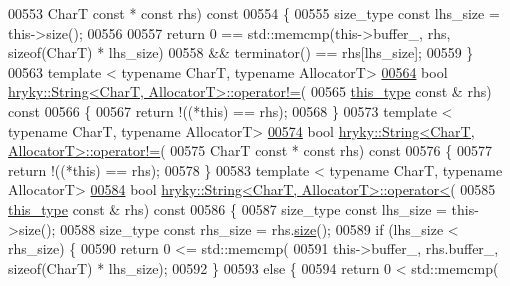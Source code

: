 \begin{DoxyCode}
00553     CharT \textcolor{keyword}{const} * \textcolor{keyword}{const} rhs)\textcolor{keyword}{ const}
00554 \textcolor{keyword}{}\{
00555     size\_type \textcolor{keyword}{const} lhs\_size = this->size();
00556     
00557     \textcolor{keywordflow}{return} 0 == std::memcmp(this->buffer\_, rhs, \textcolor{keyword}{sizeof}(CharT) * lhs\_size)
00558         && terminator() == rhs[lhs\_size];
00559 \}
00563 \textcolor{keyword}{template} < \textcolor{keyword}{typename} CharT, \textcolor{keyword}{typename} AllocatorT>
\hypertarget{string_8h_source_l00564}{}\hyperlink{classhryky_1_1_string_aab264bc0bc8f1a6c43d44dfe5ccb2b4f}{00564} \textcolor{keywordtype}{bool} \hyperlink{namespacehryky_af83d27d9a54004f5981499e910bb7cb8}{hryky::String<CharT, AllocatorT>::operator!=}(
00565     \hyperlink{classhryky_1_1_string}{this_type} \textcolor{keyword}{const} & rhs)\textcolor{keyword}{ const}
00566 \textcolor{keyword}{}\{
00567     \textcolor{keywordflow}{return} !((*this) == rhs);
00568 \}
00573 \textcolor{keyword}{template} < \textcolor{keyword}{typename} CharT, \textcolor{keyword}{typename} AllocatorT>
\hypertarget{string_8h_source_l00574}{}\hyperlink{classhryky_1_1_string_a5275fd7f49fe5ee0e36e06b9caf37295}{00574} \textcolor{keywordtype}{bool} \hyperlink{namespacehryky_af83d27d9a54004f5981499e910bb7cb8}{hryky::String<CharT, AllocatorT>::operator!=}(
00575     CharT \textcolor{keyword}{const} * \textcolor{keyword}{const} rhs)\textcolor{keyword}{ const}
00576 \textcolor{keyword}{}\{
00577     \textcolor{keywordflow}{return} !((*this) == rhs);
00578 \}
00583 \textcolor{keyword}{template} < \textcolor{keyword}{typename} CharT, \textcolor{keyword}{typename} AllocatorT>
\hypertarget{string_8h_source_l00584}{}\hyperlink{classhryky_1_1_string_a512d05bfbcc25d0946344e5494e05342}{00584} \textcolor{keywordtype}{bool} \hyperlink{namespacehryky_a7db2acd798ff6883387f9cbe3b3e820d}{hryky::String<CharT, AllocatorT>::operator<}(
00585     \hyperlink{classhryky_1_1_string}{this_type} \textcolor{keyword}{const} & rhs)\textcolor{keyword}{ const}
00586 \textcolor{keyword}{}\{
00587     size\_type \textcolor{keyword}{const} lhs\_size = this->size();
00588     size\_type \textcolor{keyword}{const} rhs\_size = rhs.\hyperlink{classhryky_1_1_string_a9db0f71dce7b2de86a54ab5323759265}{size}();
00589     \textcolor{keywordflow}{if} (lhs\_size < rhs\_size) \{
00590         \textcolor{keywordflow}{return} 0 <= std::memcmp(
00591             this->buffer\_, rhs.buffer\_, \textcolor{keyword}{sizeof}(CharT) * lhs\_size);
00592     \}
00593     \textcolor{keywordflow}{else} \{
00594         \textcolor{keywordflow}{return} 0 < std::memcmp(

\end{DoxyCode}
